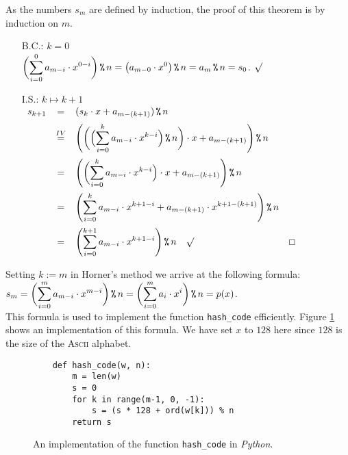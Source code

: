 \proof
As the numbers $s_m$ are defined by induction, the proof of this theorem is by
induction on $m$.
\begin{enumerate}
\item[B.C.:] $k = 0$
             \\[0.2cm]
             \hspace*{1.3cm}
           $\displaystyle\biggl(\sum\limits_{i=0}^0 a_{m-i} \cdot x^{0-i}\biggr) \,\texttt{\%}\, n = \bigl(a_{m-0} \cdot x^0
          \bigr)\,\texttt{\%}\, n = a_m \,\texttt{\%}\, n = s_0$. $\surd$
\item[I.S.:] $k \mapsto k + 1$
             \\[0.2cm]
             \hspace*{1.3cm}
             $
             \begin{array}{lcll}
               s_{k+1} & = & (s_k \cdot x + a_{m - (k+1)} ) \,\texttt{\%}\, n \\[0.2cm]
                      & \stackrel{IV}{=} & \displaystyle\Biggl(\biggl(\Bigl(\sum\limits_{i=0}^k a_{m-i} \cdot x^{k-i} \Bigr) \,\texttt{\%}\, n\biggr) \cdot x + a_{m - (k+1)}\Biggr) \,\texttt{\%}\, n
                                         \\[0.5cm]
                      & = & \displaystyle\Biggl(\biggl(\sum\limits_{i=0}^k a_{m-i} \cdot x^{k-i} \Bigr) \cdot x + a_{m - (k+1)}\Biggr) \,\texttt{\%}\, n
                            \\[0.5cm]
                      & = & \displaystyle\Biggl(\sum\limits_{i=0}^k a_{m-i} \cdot x^{k+1-i}  + a_{m - (k+1)} \cdot x^{k+1-(k+1)}\Biggr) \,\texttt{\%}\, n
                            \\[0.5cm]
                      & = & \displaystyle\Biggl(\sum\limits_{i=0}^{k+1} a_{m-i} \cdot x^{k+1-i}  \Biggr) \,\texttt{\%}\, n \quad \surd & \Box
             \end{array}
             $
\end{enumerate}
Setting $k := m$ in Horner's method we arrive at the following formula:
\\[0.2cm]
\hspace*{1.3cm}
$\displaystyle s_m = \biggl(\sum\limits_{i=0}^m a_{m - i} \cdot x^{m - i}\biggr) \,\texttt{\%}\, n = \biggl(\sum\limits_{i=0}^m a_{i} \cdot x^{i}\biggr) \,\texttt{\%}\, n = p(x)$.
\\[0.2cm]
This formula is used to implement the function \texttt{hash\_code} efficiently.
Figure \ref{fig:hash_code.py} shows an implementation of this formula.  We have set 
$x$ to $128$ here since $128$ is the size of the \textsc{Ascii} alphabet.
\begin{figure}[!ht]
\centering
\begin{verbatim}
    def hash_code(w, n):
        m = len(w)
        s = 0
        for k in range(m-1, 0, -1):
            s = (s * 128 + ord(w[k])) % n
        return s
\end{verbatim}
\vspace*{-0.3cm}
\caption{An implementation of the function \texttt{hash\_code} in \textsl{Python}.}
\label{fig:hash_code.py}
\end{figure}
